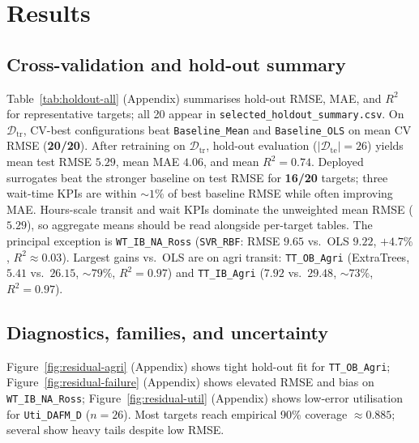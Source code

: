 \documentclass[12pt,twocolumn,a4paper]{article}
\theoremstyle{plain}
\theoremstyle{definition}
\theoremstyle{remark}
\newcommand{\train}{\mathcal{D}_{\mathrm{tr}}}
\newcommand{\test}{\mathcal{D}_{\mathrm{te}}}
\begin{document}
\section{Results}
\label{sec:results}

\subsection{Cross-validation and hold-out summary}
\label{sec:results-summary}

Table~\ref{tab:holdout-all} (Appendix) summarises hold-out RMSE, MAE, and $R^2$ for representative targets; all 20 appear in \texttt{selected\_holdout\_summary.csv}.
On $\train$, CV-best configurations beat \texttt{Baseline\_Mean} and \texttt{Baseline\_OLS} on mean CV RMSE (\textbf{20/20}).
After retraining on $\train$, hold-out evaluation ($|\test|{=}26$) yields mean test RMSE $5.29$, mean MAE $4.06$, and mean $R^2{=}0.74$.
Deployed surrogates beat the stronger baseline on test RMSE for \textbf{16/20} targets; three wait-time KPIs are within ${\sim}1\%$ of best baseline RMSE while often improving MAE.
Hours-scale transit and wait KPIs dominate the unweighted mean RMSE ($5.29$), so aggregate means should be read alongside per-target tables.
The principal exception is \texttt{WT\_IB\_NA\_Ross} (\texttt{SVR\_RBF}: RMSE $9.65$ vs.\ OLS $9.22$, $+4.7\%$, $R^2{\approx}0.03$).
Largest gains vs.\ OLS are on agri transit: \texttt{TT\_OB\_Agri} (ExtraTrees, $5.41$ vs.\ $26.15$, ${\sim}79\%$, $R^2{=}0.97$) and \texttt{TT\_IB\_Agri} ($7.92$ vs.\ $29.48$, ${\sim}73\%$, $R^2{=}0.97$).

\subsection{Diagnostics, families, and uncertainty}
\label{sec:results-diagnostics}

Figure~\ref{fig:residual-agri} (Appendix) shows tight hold-out fit for \texttt{TT\_OB\_Agri}; Figure~\ref{fig:residual-failure} (Appendix) shows elevated RMSE and bias on \texttt{WT\_IB\_NA\_Ross}; Figure~\ref{fig:residual-util} (Appendix) shows low-error utilisation for \texttt{Uti\_DAFM\_D} ($n{=}26$).
Most targets reach empirical 90\% coverage ${\approx}0.885$; several show heavy tails despite low RMSE.
\end{document}
